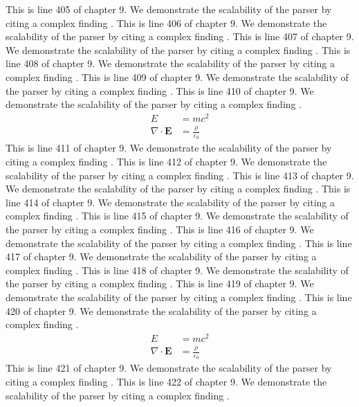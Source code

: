 This is line 405 of chapter 9. We demonstrate the scalability of the parser by citing a complex finding \cite{ref9_405}.
This is line 406 of chapter 9. We demonstrate the scalability of the parser by citing a complex finding \cite{ref9_406}.
This is line 407 of chapter 9. We demonstrate the scalability of the parser by citing a complex finding \cite{ref9_407}.
This is line 408 of chapter 9. We demonstrate the scalability of the parser by citing a complex finding \cite{ref9_408}.
This is line 409 of chapter 9. We demonstrate the scalability of the parser by citing a complex finding \cite{ref9_409}.
This is line 410 of chapter 9. We demonstrate the scalability of the parser by citing a complex finding \cite{ref9_410}.
\begin{align*}
  E &= mc^2 \\
  \nabla \cdot \mathbf{E} &= \frac{\rho}{\varepsilon_0}
\end{align*}
This is line 411 of chapter 9. We demonstrate the scalability of the parser by citing a complex finding \cite{ref9_411}.
This is line 412 of chapter 9. We demonstrate the scalability of the parser by citing a complex finding \cite{ref9_412}.
This is line 413 of chapter 9. We demonstrate the scalability of the parser by citing a complex finding \cite{ref9_413}.
This is line 414 of chapter 9. We demonstrate the scalability of the parser by citing a complex finding \cite{ref9_414}.
This is line 415 of chapter 9. We demonstrate the scalability of the parser by citing a complex finding \cite{ref9_415}.
This is line 416 of chapter 9. We demonstrate the scalability of the parser by citing a complex finding \cite{ref9_416}.
This is line 417 of chapter 9. We demonstrate the scalability of the parser by citing a complex finding \cite{ref9_417}.
This is line 418 of chapter 9. We demonstrate the scalability of the parser by citing a complex finding \cite{ref9_418}.
This is line 419 of chapter 9. We demonstrate the scalability of the parser by citing a complex finding \cite{ref9_419}.
This is line 420 of chapter 9. We demonstrate the scalability of the parser by citing a complex finding \cite{ref9_420}.
\begin{align*}
  E &= mc^2 \\
  \nabla \cdot \mathbf{E} &= \frac{\rho}{\varepsilon_0}
\end{align*}
This is line 421 of chapter 9. We demonstrate the scalability of the parser by citing a complex finding \cite{ref9_421}.
This is line 422 of chapter 9. We demonstrate the scalability of the parser by citing a complex finding \cite{ref9_422}.
